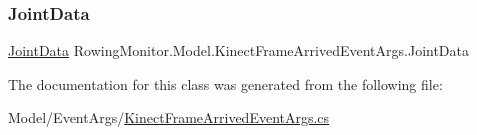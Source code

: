 \subsubsection{\texorpdfstring{Joint\+Data}{JointData}}
{\footnotesize\ttfamily \hyperlink{struct_rowing_monitor_1_1_model_1_1_util_1_1_joint_data}{Joint\+Data} Rowing\+Monitor.\+Model.\+Kinect\+Frame\+Arrived\+Event\+Args.\+Joint\+Data\hspace{0.3cm}{\ttfamily [get]}}



The documentation for this class was generated from the following file\+:\begin{DoxyCompactItemize}
\item 
Model/\+Event\+Args/\hyperlink{_kinect_frame_arrived_event_args_8cs}{Kinect\+Frame\+Arrived\+Event\+Args.\+cs}\end{DoxyCompactItemize}
